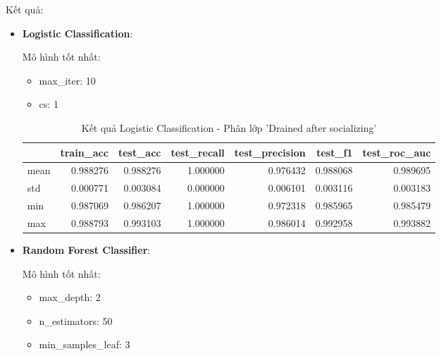     Kết quả:
    \begin{itemize}
        \item \textbf{Logistic Classification}: 
        
            Mô hình tốt nhất:
            \begin{itemize}
                \item max\_iter: 10
                \item cs: 1
            \end{itemize}

            \begin{table}[htbp]
            \centering
            \caption{Kết quả Logistic Classification - Phân lớp 'Drained after socializing'}
            \label{tab:Behavior-drain-LogCV}
            \begin{tabular}{lrrrrrr}
                \hline
                & train\_acc & test\_acc & test\_recall & test\_precision & test\_f1 & test\_roc\_auc \\
                \hline
                mean & 0.988276 & 0.988276 & 1.000000 & 0.976432 & 0.988068 & 0.989695 \\
                std & 0.000771 & 0.003084 & 0.000000 & 0.006101 & 0.003116 & 0.003183 \\
                min & 0.987069 & 0.986207 & 1.000000 & 0.972318 & 0.985965 & 0.985479 \\
                max & 0.988793 & 0.993103 & 1.000000 & 0.986014 & 0.992958 & 0.993882 \\
                \hline
            \end{tabular}
            \end{table}
  
            
            \FloatBarrier
            
        \item \textbf{Random Forest Classifier}:

            Mô hình tốt nhất:
            \begin{itemize}
                \item max\_depth: 2
                \item n\_estimators: 50
                \item min\_samples\_leaf: 3
            \end{itemize}


\end{itemize}
